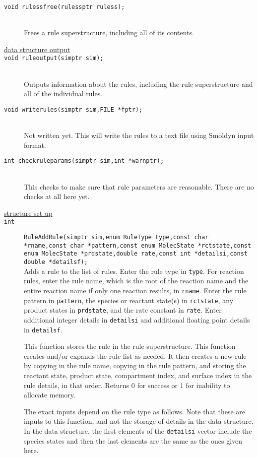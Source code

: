 \documentclass {scrbook}
\newcommand {\ttt} {\texttt}
\begin{document}
\begin{description}
\item[\ttt{void rulessfree(rulessptr ruless);}]
\hfill \\
Frees a rule superstructure, including all of its contents.

\item[\underline{data structure output}]

\item[\ttt{void ruleoutput(simptr sim);}]
\hfill \\
Outputs information about the rules, including the rule superstructure and all of the individual rules.

\item[\ttt{void writerules(simptr sim,FILE *fptr);}]
\hfill \\
Not written yet. This will write the rules to a text file using Smoldyn input format.

\item[\ttt{int checkruleparams(simptr sim,int *warnptr);}]
\hfill \\
This checks to make sure that rule parameters are reasonable. There are no checks at all here yet.

\item[\underline{structure set up}]

\item[\ttt{int}]
\ttt{RuleAddRule(simptr sim,enum RuleType type,const char *rname,const char *pattern,const enum MolecState *rctstate,const enum MolecState *prdstate,double rate,const int *detailsi,const double *detailsf);}
\hfill \\
Adds a rule to the list of rules. Enter the rule type in \ttt{type}. For reaction rules, enter the rule name, which is the root of the reaction name and the entire reaction name if only one reaction results, in \ttt{rname}. Enter the rule pattern in \ttt{pattern}, the species or reactant state(s) in \ttt{rctstate}, any product states in \ttt{prdstate}, and the rate constant in \ttt{rate}. Enter additional integer details in \ttt{detailsi} and additional floating point details in \ttt{detailsf}.

This function stores the rule in the rule superstructure. This function creates and/or expands the rule list as needed. It then creates a new rule by copying in the rule name, copying in the rule pattern, and storing the reactant state, product state, compartment index, and surface index in the rule details, in that order. Returns 0 for success or 1 for inability to allocate memory.

The exact inputs depend on the rule type as follows. Note that these are inputs to this function, and not the storage of details in the data structure. In the data structure, the first elements of the \ttt{detailsi} vector include the species states and then the last elements are the same as the ones given here.


\end{description}
\end{document}
